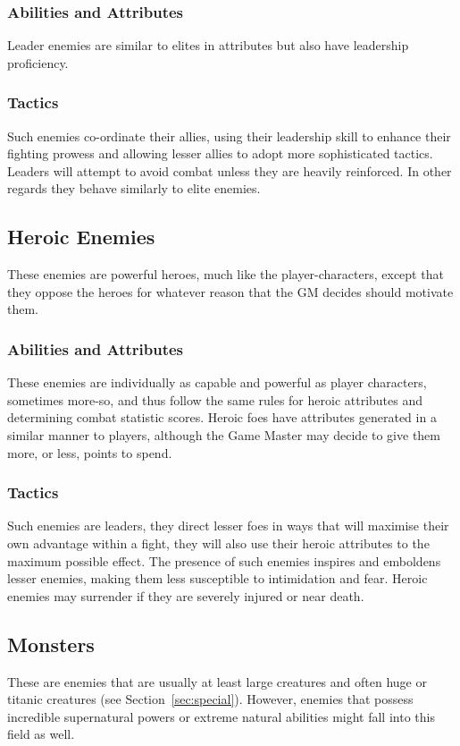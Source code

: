 \documentclass[a4paper,10pt,oneside]{book}
\begin{document}
\subsubsection{Abilities and Attributes}
Leader enemies are similar to elites in attributes but also have leadership proficiency.
\subsubsection{Tactics}
Such enemies co-ordinate their allies, using their leadership skill to enhance their fighting prowess and allowing lesser allies to adopt more sophisticated tactics. Leaders will attempt to avoid combat unless they are heavily reinforced. In other regards they behave similarly to elite enemies.

\subsection{Heroic Enemies}
These enemies are powerful heroes, much like the player-characters, except that they oppose the heroes for whatever reason that the GM decides should motivate them.
\subsubsection{Abilities and Attributes}
These enemies are individually as capable and powerful as player characters, sometimes more-so, and thus follow the same rules for heroic attributes and determining combat statistic scores. Heroic foes have attributes generated in a similar manner to players, although the Game Master may decide to give them more, or less, points to spend.
\subsubsection{Tactics}
Such enemies are leaders, they direct lesser foes in ways that will maximise their own advantage within a fight, they will also use their heroic attributes to the maximum possible effect. The presence of such enemies inspires and emboldens lesser enemies, making them less susceptible to intimidation and fear. Heroic enemies may surrender if they are severely injured or near death.

\subsection{Monsters}
These are enemies that are usually at least large creatures and often huge or titanic creatures (see Section~\ref{sec:special}). However, enemies that possess incredible supernatural powers or extreme natural abilities might fall into this field as well.
\end{document}
